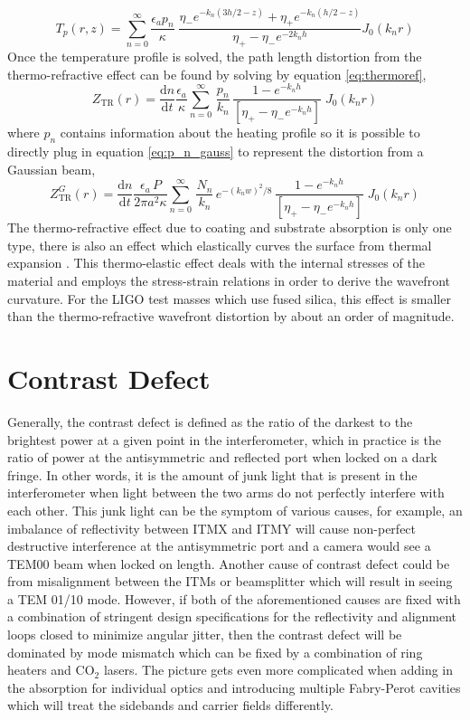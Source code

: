 	\begin{equation}
	T_p(r,z) = \sum_{n=0}^{\infty} \frac{\epsilon_a p_n}{\kappa}  \; \frac{ \eta_{-}e^{-k_n(3h/2-z)} + \eta_{+}e^{-k_n(h/2-z)}  }{\eta_{+} - \eta_{-} e^{-2k_n h} } J_0(k_n r)
	\end{equation} 
	Once the temperature profile is solved, the path length distortion from the thermo-refractive effect can be found by solving by equation \ref{eq:thermoref},
	\begin{equation}
	Z_{\text{TR}}(r) = \frac{\text{d}n}{\text{d}t} \frac{\epsilon_a}{\kappa} \sum_{n=0}^{\infty} \, \frac{p_n}{k_n} \, \frac{1- e^{-k_n h}}{[\eta_{+} - \eta_{-} e^{-k_nh}]} \; J_0(k_n r) 
	\end{equation}
	where $p_n$ contains information about the heating profile so it is possible to directly plug in equation \ref{eq:p_n_gauss} to represent the distortion from a Gaussian beam,
	\begin{equation}
	Z_{\text{TR}}^{G}(r) =  \frac{\text{d}n}{\text{d}t} \frac{\epsilon_a \, P}{2\pi a^2 \kappa} \sum_{n=0}^{\infty} \, \frac{N_n}{k_n}\, e^{-(k_n w)^2/8} \, \frac{1- e^{-k_n h}}{[\eta_{+} - \eta_{-} e^{-k_nh}]} \; J_0(k_n r) 
	\end{equation}
	The thermo-refractive effect due to coating and substrate absorption is only one type, there is also an effect which elastically curves the surface from thermal expansion \cite{Vinet_Thermal_Issues}.  This thermo-elastic effect deals with the internal stresses of the material and employs the stress-strain relations in order to derive the wavefront curvature.  For the LIGO test masses which use fused silica, this effect is smaller than the thermo-refractive wavefront distortion by about an order of magnitude.
	
	\section{Contrast Defect}
	Generally, the contrast defect is defined as the ratio of the darkest to the brightest power at a given point in the interferometer, which in practice is the ratio of power at the antisymmetric and reflected port when locked on a dark fringe.  In other words, it is the amount of junk light that is present in the interferometer when light between the two arms do not perfectly interfere with each other. This junk light can be the symptom of various causes, for example, an imbalance of reflectivity between ITMX and ITMY will cause non-perfect destructive interference at the antisymmetric port and a camera would see a TEM00 beam when locked on length.  Another cause of contrast defect could be from misalignment between the ITMs or beamsplitter which will result in seeing a TEM 01/10 mode.  However, if both of the aforementioned causes are fixed with a combination of stringent design specifications for the reflectivity and alignment loops closed to minimize angular jitter, then the contrast defect will be dominated by mode mismatch which can be fixed by a combination of ring heaters and CO$_2$ lasers.  The picture gets even more complicated when adding in the absorption for individual optics and introducing multiple Fabry-Perot cavities which will treat the sidebands and carrier fields differently.  
	
